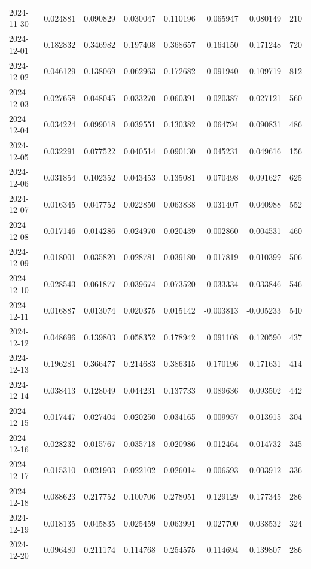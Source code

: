 \begin{tabular}{lrrrrrrr}
2024-11-30 & 0.024881 & 0.090829 & 0.030047 & 0.110196 & 0.065947 & 0.080149 & 210 \\
2024-12-01 & 0.182832 & 0.346982 & 0.197408 & 0.368657 & 0.164150 & 0.171248 & 720 \\
2024-12-02 & 0.046129 & 0.138069 & 0.062963 & 0.172682 & 0.091940 & 0.109719 & 812 \\
2024-12-03 & 0.027658 & 0.048045 & 0.033270 & 0.060391 & 0.020387 & 0.027121 & 560 \\
2024-12-04 & 0.034224 & 0.099018 & 0.039551 & 0.130382 & 0.064794 & 0.090831 & 486 \\
2024-12-05 & 0.032291 & 0.077522 & 0.040514 & 0.090130 & 0.045231 & 0.049616 & 156 \\
2024-12-06 & 0.031854 & 0.102352 & 0.043453 & 0.135081 & 0.070498 & 0.091627 & 625 \\
2024-12-07 & 0.016345 & 0.047752 & 0.022850 & 0.063838 & 0.031407 & 0.040988 & 552 \\
2024-12-08 & 0.017146 & 0.014286 & 0.024970 & 0.020439 & -0.002860 & -0.004531 & 460 \\
2024-12-09 & 0.018001 & 0.035820 & 0.028781 & 0.039180 & 0.017819 & 0.010399 & 506 \\
2024-12-10 & 0.028543 & 0.061877 & 0.039674 & 0.073520 & 0.033334 & 0.033846 & 546 \\
2024-12-11 & 0.016887 & 0.013074 & 0.020375 & 0.015142 & -0.003813 & -0.005233 & 540 \\
2024-12-12 & 0.048696 & 0.139803 & 0.058352 & 0.178942 & 0.091108 & 0.120590 & 437 \\
2024-12-13 & 0.196281 & 0.366477 & 0.214683 & 0.386315 & 0.170196 & 0.171631 & 414 \\
2024-12-14 & 0.038413 & 0.128049 & 0.044231 & 0.137733 & 0.089636 & 0.093502 & 442 \\
2024-12-15 & 0.017447 & 0.027404 & 0.020250 & 0.034165 & 0.009957 & 0.013915 & 304 \\
2024-12-16 & 0.028232 & 0.015767 & 0.035718 & 0.020986 & -0.012464 & -0.014732 & 345 \\
2024-12-17 & 0.015310 & 0.021903 & 0.022102 & 0.026014 & 0.006593 & 0.003912 & 336 \\
2024-12-18 & 0.088623 & 0.217752 & 0.100706 & 0.278051 & 0.129129 & 0.177345 & 286 \\
2024-12-19 & 0.018135 & 0.045835 & 0.025459 & 0.063991 & 0.027700 & 0.038532 & 324 \\
2024-12-20 & 0.096480 & 0.211174 & 0.114768 & 0.254575 & 0.114694 & 0.139807 & 286 \\

\end{tabular}

